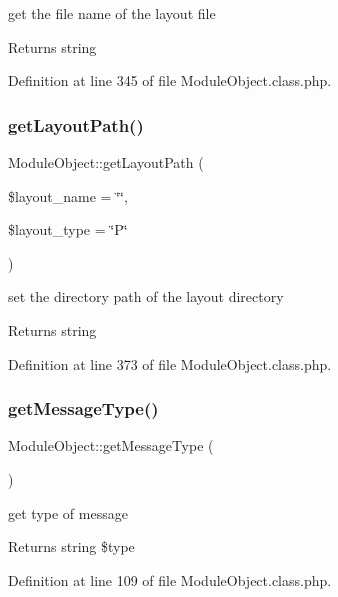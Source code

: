 get the file name of the layout file \begin{DoxyReturn}{Returns}
string 
\end{DoxyReturn}


Definition at line 345 of file Module\+Object.\+class.\+php.

\mbox{\label{classModuleObject_ad3f6b56ddff1e52a49015771d0a08336}} 
\subsubsection{\texorpdfstring{get\+Layout\+Path()}{getLayoutPath()}}
{\footnotesize\ttfamily Module\+Object\+::get\+Layout\+Path (\begin{DoxyParamCaption}\item[{}]{\$layout\+\_\+name = {\ttfamily \char`\"{}\char`\"{}},  }\item[{}]{\$layout\+\_\+type = {\ttfamily \char`\"{}P\char`\"{}} }\end{DoxyParamCaption})}

set the directory path of the layout directory \begin{DoxyReturn}{Returns}
string 
\end{DoxyReturn}


Definition at line 373 of file Module\+Object.\+class.\+php.

\mbox{\label{classModuleObject_aa0c2daa9dda892df56eb5fe7c754e25b}} 
\subsubsection{\texorpdfstring{get\+Message\+Type()}{getMessageType()}}
{\footnotesize\ttfamily Module\+Object\+::get\+Message\+Type (\begin{DoxyParamCaption}{ }\end{DoxyParamCaption})}

get type of message \begin{DoxyReturn}{Returns}
string \$type 
\end{DoxyReturn}


Definition at line 109 of file Module\+Object.\+class.\+php.

